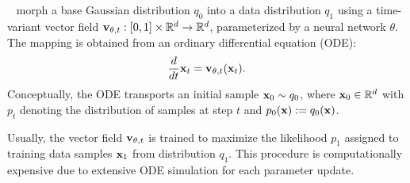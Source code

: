 ~\cite{chen2018neural} morph a base Gaussian distribution $q_0$ into a data distribution $q_1$ using a time-variant vector field ${\mathbf{v}}_{\theta, t} : [0, 1] \times \mathbb{R}^d \rightarrow \mathbb{R}^d$, parameterized by a neural network $\theta$. The mapping is obtained from an ordinary differential equation (ODE):
%
\begin{equation}
\frac{d}{dt} {\mathbf{x}}_t = {\mathbf{v}}_{\theta, t}({\mathbf{x}}_t).
\end{equation}
Conceptually, the ODE transports an initial sample ${\mathbf{x}}_0 \sim q_0$, where ${\mathbf{x}}_0 \in \mathbb{R}^d$ with $p_t$ denoting the distribution of samples at step $t$ and $p_0({\mathbf{x}}) := q_0({\mathbf{x}})$.
%
\iffalse
This results in a probability trajectory $p_t : [0, 1] \times \mathbb{R}^d \rightarrow \mathbb{R}_{> 0}$, delineated by the inverse mapping $\phi_t^{-1}$:
\begin{equation}
\label{eq:push_forward}
p_t(x) = p_0(\phi_t^{-1}(x)) \text{det}[\frac{\partial \phi_t^{-1}}{\partial x}(x)],
\end{equation}
%
where $p_0 = q_0$.
\fi
Usually, the vector field ${\mathbf{v}}_{\theta,t}$ is trained to maximize the likelihood $p_1$ assigned to training data samples ${\mathbf{x}}_1$ from distribution $q_1$.
%
This procedure is computationally expensive due to extensive ODE simulation for each parameter update.
%

